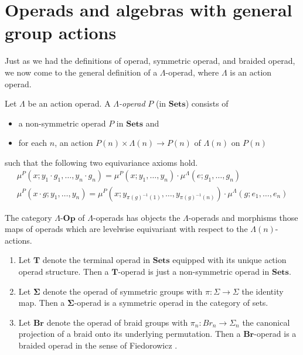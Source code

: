 \documentclass{amsbook} %
\newcommand{\mb}{\mathbf}
\numberwithin{section}{chapter}
\begin{document}
\section{Operads and algebras with general group actions}
Just as we had the definitions of operad, symmetric operad, and braided operad, we now come to the general definition of a $\Lambda$-operad, where $\Lambda$ is an action operad.

\begin{Defi}
Let $\Lambda$ be an action operad.  A \textit{$\Lambda$-operad} $P$ (in $\mb{Sets}$) consists of
\begin{itemize}
\item a non-symmetric operad $P$ in $\mb{Sets}$ and
\item for each $n$, an action $P(n) \times \Lambda(n) \rightarrow P(n)$ of $\Lambda(n)$ on $P(n)$
\end{itemize}
such that the following two equivariance axioms hold.
\[
\begin{array}{c}
\mu^{P}(x; y_{1} \cdot g_{1}, \ldots, y_{n} \cdot g_{n}) =\mu^{P}(x; y_{1}, \ldots, y_{n}) \cdot \mu^{\Lambda}(e; g_{1}, \ldots, g_{n})  \\
\mu^{P}(x \cdot g; y_{1}, \ldots, y_{n})  =  \mu^{P}(x; y_{\pi(g)^{-1}(1)}, \ldots, y_{\pi(g)^{-1}(n)}) \cdot \mu^{\Lambda}(g; e_{1}, \ldots, e_{n})
\end{array}
\]
\end{Defi}

\begin{Defi}
The category $\Lambda\mbox{-}\mb{Op}$ of $\Lambda$-operads has objects the $\Lambda$-operads and morphisms those maps of operads which are levelwise equivariant with respect to the $\Lambda(n)$-actions.
\end{Defi}

\begin{example}
\begin{enumerate}
\item Let $\mb{T}$ denote the terminal operad in $\mb{Sets}$ equipped with its unique action operad structure.  Then a $\mb{T}$-operad is just a non-symmetric operad in $\mb{Sets}$.
\item Let $\mb{\Sigma}$ denote the operad of symmetric groups with $\pi:\Sigma \rightarrow \Sigma$ the identity map.  Then a $\mb{\Sigma}$-operad is a symmetric operad in the category of sets.
\item Let $\mb{Br}$ denote the operad of braid groups with $\pi_{n}:Br_{n} \rightarrow \Sigma_{n}$ the canonical projection of a braid onto its underlying permutation.  Then a $\mb{Br}$-operad is a braided operad in the sense of Fiedorowicz \cite{fie-br}.
\end{enumerate}
\end{example}
\end{document}
